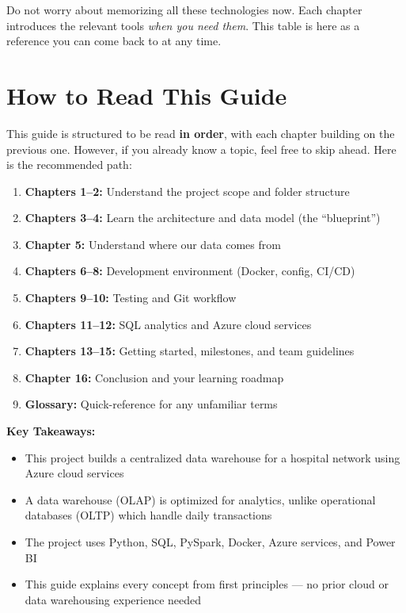 \documentclass[12pt, a4paper, oneside]{report}
\begin{document}
\begin{tipbox}
    Do not worry about memorizing all these technologies now. Each chapter introduces the relevant tools \textit{when you need them}. This table is here as a reference you can come back to at any time.
\end{tipbox}

\section{How to Read This Guide}

This guide is structured to be read \textbf{in order}, with each chapter building on the previous one. However, if you already know a topic, feel free to skip ahead. Here is the recommended path:

\begin{enumerate}[label=\textcolor{primary}{\textbf{\arabic*.}}]
    \item \textbf{Chapters 1--2:} Understand the project scope and folder structure
    \item \textbf{Chapters 3--4:} Learn the architecture and data model (the ``blueprint'')
    \item \textbf{Chapter 5:} Understand where our data comes from
    \item \textbf{Chapters 6--8:} Development environment (Docker, config, CI/CD)
    \item \textbf{Chapters 9--10:} Testing and Git workflow
    \item \textbf{Chapters 11--12:} SQL analytics and Azure cloud services
    \item \textbf{Chapters 13--15:} Getting started, milestones, and team guidelines
    \item \textbf{Chapter 16:} Conclusion and your learning roadmap
    \item \textbf{Glossary:} Quick-reference for any unfamiliar terms
\end{enumerate}

\begin{summarybox}
\textbf{Key Takeaways:}
\begin{itemize}
    \item This project builds a centralized data warehouse for a hospital network using Azure cloud services
    \item A data warehouse (OLAP) is optimized for analytics, unlike operational databases (OLTP) which handle daily transactions
    \item The project uses Python, SQL, PySpark, Docker, Azure services, and Power BI
    \item This guide explains every concept from first principles --- no prior cloud or data warehousing experience needed
\end{itemize}
\end{summarybox}
\end{document}

